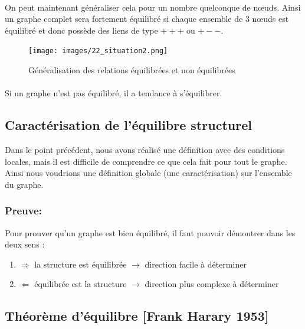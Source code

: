 \paragraph{}
 
 On peut maintenant généraliser cela pour un nombre quelconque de nœuds. Ainsi un graphe complet sera fortement équilibré si chaque ensemble de 3 nœuds est équilibré et donc possède des liens de type $+++$ ou $+--$.   

\begin{figure}[h!]
	\centering
	\texttt{[image: images/22\_situation2.png]}
	\label{equi2}
	\caption{Généralisation des relations équilibrées et non équilibrées}
\end{figure}

\paragraph{}
Si un graphe n'est pas équilibré, il a tendance à s'équilibrer. 


\subsection{Caractérisation de l'équilibre structurel} 
Dans le point précédent, nous avons réalisé une définition avec des conditions locales, mais il est difficile de comprendre ce que cela fait pour tout le graphe.
Ainsi nous voudrions une définition globale (une caractérisation) sur l'ensemble du graphe.




\subsubsection*{Preuve:}
Pour prouver qu'un graphe est bien équilibré, il faut pouvoir démontrer dans les deux sens :
\begin{enumerate}

\item $\Rightarrow$ la structure est équilibrée 
$\rightarrow$ direction facile à déterminer
\item $\Leftarrow$ équilibrée est la structure 
$\rightarrow$ direction plus complexe à déterminer

\end{enumerate}

\subsection{Théorème d'équilibre [Frank Harary 1953]}


